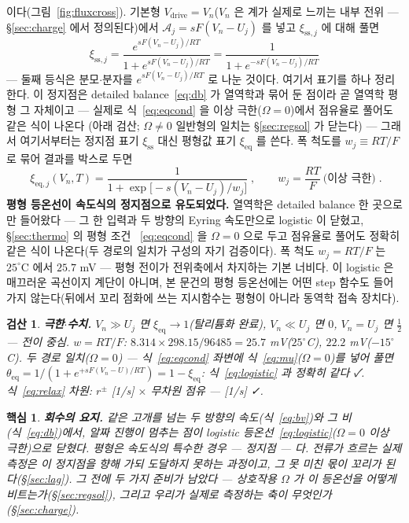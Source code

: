 \documentclass[11pt,a4paper]{article}
\newtheorem*{keybox}{핵심}
\newtheorem*{verifybox}{검산}
\newcommand{\eq}{\mathrm{eq}}
\newcommand{\drive}{\mathrm{drive}}
\newcommand{\sstat}{\mathrm{ss}}
\begin{document}
이다(그림~\ref{fig:fluxcross}). 기본형 $V_\drive=V_n$($V_n$ 은 계가 실제로 느끼는 내부 전위 —
\S\ref{sec:charge} 에서 정의된다)에서 $\mathcal A_j=sF(V_n-U_j)$ 를 넣고 $\xi_{\sstat,j}$ 에 대해 풀면
\begin{equation}
\xi_{\sstat,j}
=\frac{e^{sF(V_n-U_j)/RT}}{1+e^{sF(V_n-U_j)/RT}}
=\frac{1}{1+e^{-sF(V_n-U_j)/RT}}
\label{eq:logisticsolve}
\end{equation}
— 둘째 등식은 분모$\cdot$분자를 $e^{sF(V_n-U_j)/RT}$ 로 나눈 것이다. 여기서 표기를 하나 정리한다.
이 정지점은 detailed balance~\eqref{eq:db} 가 열역학과 묶어 둔 점이라 곧 열역학 평형 그 자체이고
— 실제로 식~\eqref{eq:eqcond} 을 이상 극한($\Omega=0$)에서 점유율로 풀어도 같은 식이 나온다
(아래 검산; $\Omega\ne0$ 일반형의 일치는 \S\ref{sec:regsol} 가 닫는다) — 그래서 여기서부터는
정지점 표기 $\xi_{\sstat}$ 대신 평형값 표기 $\xi_{\eq}$ 를 쓴다. 폭 척도를 $w_j\equiv RT/F$ 로
묶어 결과를 박스로 두면
\begin{equation}
\boxed{\;\xi_{\eq,j}(V_n,T)=\frac{1}{1+\exp\!\big[-s(V_n-U_j)/w_j\big]}\;,\qquad
w_j=\frac{RT}{F}\ \text{(이상 극한)}\;.}
\label{eq:logistic}
\end{equation}
\textbf{평형 등온선이 속도식의 정지점으로 유도되었다.} 열역학은 detailed balance 한 곳으로만
들어왔다 — 그 한 입력과 두 방향의 Eyring 속도만으로 logistic 이 닫혔고, \S\ref{sec:thermo} 의 평형 조건
~\eqref{eq:eqcond} 을 $\Omega=0$ 으로 두고 점유율로 풀어도 정확히 같은 식이 나온다(두 경로의
일치가 구성의 자기 검증이다).
폭 척도 $w_j=RT/F$ 는 $25^\circ$C 에서 $25.7$ mV — 평형 전이가 전위축에서 차지하는 기본 너비다. 이
logistic 은 매끄러운 곡선이지 계단이 아니며, 본 문건의 평형 등온선에는 어떤 step 함수도 들어가지
않는다(뒤에서 꼬리 점화에 쓰는 지시함수는 평형이 아니라 동역학 접속 장치다).

\begin{verifybox}
\textbf{극한$\cdot$수치.} $V_n\gg U_j$ 면 $\xi_{\eq}\to1$(탈리튬화 완료), $V_n\ll U_j$ 면 $0$,
$V_n=U_j$ 면 $\tfrac12$ — 전이 중심. $w=RT/F$: $8.314\times298.15/96485=25.7$ mV($25^\circ$C),
$22.2$ mV($-15^\circ$C). 두 경로 일치($\Omega=0$) — 식~\eqref{eq:eqcond} 좌변에 식~\eqref{eq:mu}($\Omega=0$)를 넣어 풀면
$\theta_{\eq}=1/(1+e^{+sF(V_n-U)/RT})=1-\xi_{\eq}$: 식~\eqref{eq:logistic} 과 정확히 같다 ✓.
식~\eqref{eq:relax} 차원: $r^\pm$ [1/s] $\times$ 무차원 점유 — [1/s] ✓.
\end{verifybox}

\begin{keybox}
\textbf{회수의 요지.} 같은 고개를 넘는 두 방향의 속도(식~\eqref{eq:bv})와 그 비(식~\eqref{eq:db})에서,
알짜 진행이 멈추는 점이 logistic 등온선~\eqref{eq:logistic}($\Omega=0$ 이상 극한)으로 닫혔다. 평형은 속도식의 특수한 경우 —
정지점 — 다. 전류가 흐르는 실제 측정은 이 정지점을 \emph{향해 가되 도달하지 못하는} 과정이고, 그 못 미친
몫이 꼬리가 된다(\S\ref{sec:lag}). 그 전에 두 가지 준비가 남았다 — 상호작용 $\Omega$ 가 이 등온선을
어떻게 비트는가(\S\ref{sec:regsol}), 그리고 우리가 실제로 측정하는 축이 무엇인가(\S\ref{sec:charge}).
\end{keybox}
\end{document}

